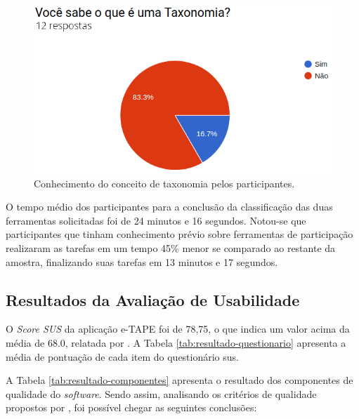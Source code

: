 \begin{figure}[!ht]
    \centering
    \includegraphics[scale=0.4]{./figuras/sabe_taxonomia.png}
    \caption{Conhecimento do conceito de taxonomia pelos participantes.}
    \label{fig:grafico-conhe-taxonomia}
\end{figure}

\par
O tempo médio dos participantes para a conclusão da classificação das duas ferramentas solicitadas foi de 24 minutos e 16 segundos. 
Notou-se que participantes que tinham conhecimento prévio sobre ferramentas de participação realizaram 
as tarefas em um tempo 45\% menor se comparado ao restante da amostra, finalizando suas tarefas em 13 minutos e 17 segundos.

\subsection{Resultados da Avaliação de Usabilidade}
\label{subsec:resultados-sus}
O \textit{Score SUS} da aplicação e-TAPE foi de 78,75, o que indica um valor acima da média de 68.0, relatada por .
A Tabela \ref{tab:resultado-questionario} apresenta a média de pontuação de cada item do questionário \acrshort{sus}.

\par
A Tabela \ref{tab:resultado-componentes} apresenta o resultado dos componentes de qualidade do \textit{software}. Sendo assim, analisando os critérios de qualidade propostos
por , foi possível chegar as seguintes conclusões:

